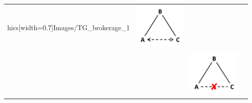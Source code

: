 \begin{table}
{\begin{threeparttable}
\begin{tabular*}{\textwidth}{>{\raggedright}p{5cm}>{\raggedright\arraybackslash}p{6cm}>{\raggedright\arraybackslash}p{6cm}>{\raggedright\arraybackslash}p{6cm}}
hics[width=0.7\linewidth]{Images/TG_brokerage_1} \end{minipage}  & \begin{minipage}{0.2\textwidth} \centering \includegraphics[width=0.7\linewidth]{Images/TI_brokerage} \end{minipage}   \\
&  & \begin{minipage}{0.2\textwidth} \centering \includegraphics[width=0.7\linewidth]{Images/TG_brokerage_2} \end{minipage}  & \\

\end{tabular*}
\end{threeparttable}}
\end{table}
